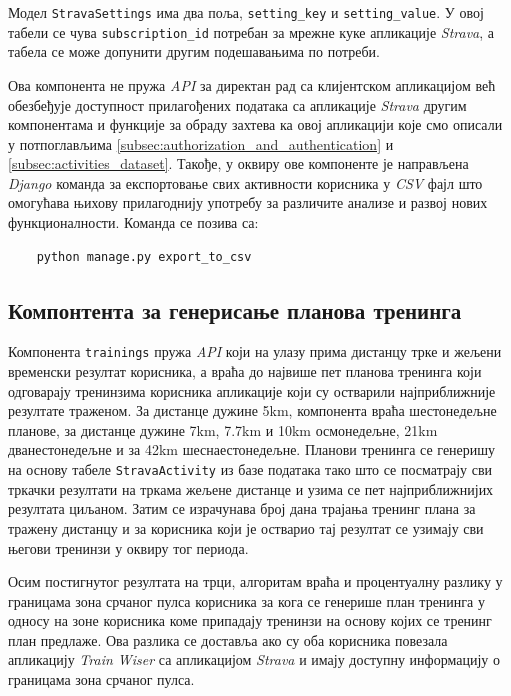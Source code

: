 \documentclass[12pt,oneside]{memoir}
\begin{document}
Модел \texttt{StravaSettings} има два поља, \texttt{setting\_key} и \texttt{setting\_value}. У овој табели се чува \texttt{subscription\_id} потребан за мрежне куке апликације \textit{Strava}, а табела се може допунити другим подешавањима по потреби.

Ова компонента не пружа \textit{API} за директан рад са клијентском апликацијом већ обезбеђује доступност прилагођених података са апликације \textit{Strava} другим компонентама и функције за обраду захтева ка овој апликацији које смо описали у потпоглављима \ref{subsec:authorization_and_authentication} и \ref{subsec:activities_dataset}. Такође, у оквиру ове компоненте је направљена \textit{Django} команда за експортовање свих активности корисника у \textit{CSV} фајл што омогућава њихову прилагоднију употребу за различите анализе и развој нових функционалности. Команда се позива са:

\begin{lstlisting}
    python manage.py export_to_csv
\end{lstlisting}

\subsection{Компонтента за генерисање планова тренинга}

Компонента \texttt{trainings} пружа \textit{API} који на улазу прима дистанцу трке и жељени временски резултат корисника, а враћа до највише пет планова тренинга који одговарају тренинзима корисника апликације који су остварили најприближније резултате траженом. За дистанце дужине 5km, компонента враћа шестонедељне планове, за дистанце дужине 7km, 7.7km и 10km осмонедељне, 21km дванестонедељне и за 42km шеснаестонедељне. Планови тренинга се генеришу на основу табеле \texttt{StravaActivity} из базе података тако што се посматрају сви тркачки резултати на тркама жељене дистанце и узима се пет најприближнијих резултата циљаном. Затим се израчунава број дана трајања тренинг плана за тражену дистанцу и за корисника који је остварио тај резултат се узимају сви његови тренинзи у оквиру тог периода. 

Осим постигнутог резултата на трци, алгоритам враћа и процентуалну разлику у границама зона срчаног пулса корисника за кога се генерише план тренинга у односу на зоне корисника коме припадају тренинзи на основу којих се тренинг план предлаже. Ова разлика се доставља ако су оба корисника повезала апликацију \textit{Train Wiser} са апликацијом \textit{Strava} и имају доступну информацију о границама зона срчаног пулса.
\end{document}

